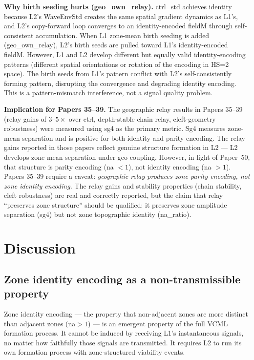 \documentclass[11pt,a4paper]{article}
\begin{document}
\textbf{Why birth seeding hurts (geo\_own\_relay).}
ctrl\_std achieves identity because L2's WaveEnvStd creates the same spatial gradient
dynamics as L1's, and L2's copy-forward loop converges to an identity-encoded fieldM
through self-consistent accumulation.
When L1 zone-mean birth seeding is added (geo\_own\_relay), L2's birth seeds are
pulled toward L1's identity-encoded fieldM.
However, L1 and L2 develop different but equally valid identity-encoding patterns
(different spatial orientations or rotation of the encoding in HS=2 space).
The birth seeds from L1's pattern conflict with L2's self-consistently forming pattern,
disrupting the convergence and degrading identity encoding.
This is a pattern-mismatch interference, not a signal quality problem.

\textbf{Implication for Papers 35--39.}
The geographic relay results in Papers 35--39 (relay gains of $3\text{--}5\times$
over ctrl, depth-stable chain relay, cleft-geometry robustness) were measured using
sg4 as the primary metric.
Sg4 measures zone-mean separation and is positive for both identity and parity encoding.
The relay gains reported in those papers reflect genuine structure formation in L2
--- L2 develops zone-mean separation under geo coupling.
However, in light of Paper~50, that structure is parity encoding (na $< 1$),
not identity encoding (na $> 1$).
Papers 35--39 require a caveat: \emph{geographic relay produces zone parity encoding,
not zone identity encoding.}
The relay gains and stability properties (chain stability, cleft robustness) are real
and correctly reported, but the claim that relay ``preserves zone structure'' should
be qualified: it preserves zone amplitude separation (sg4) but not zone topographic
identity (na\_ratio).

\section{Discussion}

\subsection{Zone identity encoding as a non-transmissible property}

Zone identity encoding --- the property that non-adjacent zones are more distinct
than adjacent zones (na$>1$) --- is an emergent property of the full VCML formation
process.
It cannot be induced by receiving L1's instantaneous signals, no matter how faithfully
those signals are transmitted.
It requires L2 to run its own formation process with zone-structured viability events.
\end{document}
